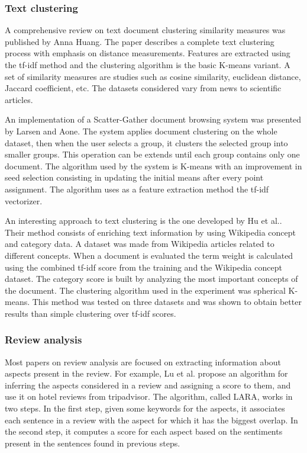 \documentclass[12pt]{article}
\begin{document}
	\subsubsection{Text clustering}
	A comprehensive review on text document clustering similarity measures was published by Anna Huang\cite{TextClustering}. The paper describes a complete text clustering process with emphasis on distance measurements. Features are extracted using the tf-idf method and the clustering algorithm is the basic K-means variant. A set of similarity measures are studies such as cosine similarity, euclidean distance, Jaccard coefficient, etc. The datasets considered vary from news to scientific articles.
	
	An implementation of a Scatter-Gather document browsing system was presented by Larsen and Aone\cite{ScatterGather}. The system applies document clustering on the whole dataset, then when the user selects a group, it clusters the selected group into smaller groups. This operation can be extends until each group contains only one document. The algorithm used by the system is K-means with an improvement in seed selection consisting in updating the initial means after every point assignment. The algorithm uses as a feature extraction method the tf-idf vectorizer.
	
	An interesting approach to text clustering is the one developed by Hu et al.\cite{WikipediaKmeans}. Their method consists of enriching text information by using Wikipedia concept and category data. A dataset was made from Wikipedia articles related to different concepts. When a document is evaluated the term weight is calculated using the combined tf-idf score from the training and the Wikipedia concept dataset. The category score is built by analyzing the most important concepts of the document. The clustering algorithm used in the experiment was spherical K-means. This method was tested on three datasets and was shown to obtain better results than simple clustering over tf-idf scores.
	
	\subsubsection{Review analysis}
	Most papers on review analysis are focused on extracting information about aspects present in the review. For example, Lu et al.\cite{LARA} propose an algorithm for inferring the aspects considered in a review and assigning a score to them, and use it on hotel reviews from tripadvisor. The algorithm, called LARA, works in two steps. In the first step, given some keywords for the aspects, it associates each sentence in a review with the aspect for which it has the biggest overlap. In the second step, it computes a score for each aspect based on the sentiments present in the sentences found in previous steps.
	
\end{document}
